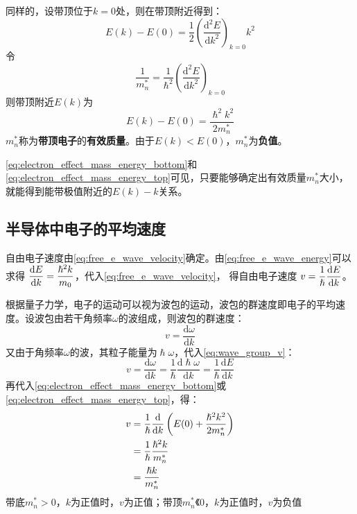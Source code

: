 同样的，设带顶位于$k=0$处，则在带顶附近得到：
\begin{equation}
    E(k)-E(0)=\frac{1}{2}\left(\frac{\mathrm{d^2}E}{\mathrm{d}k^2}\right)_{k=0}k^2
\end{equation}
令
\begin{equation*}
    \frac{1}{m_n^*}=\frac{1}{\hslash^2}\left(\frac{\mathrm{d}^2E}{\mathrm{d}k^2}\right)_{k=0}
\end{equation*}
则带顶附近$E(k)$为
\begin{equation}
    E(k)-E(0)=\frac{\hslash^2k^2}{2m_n^*}\label{eq:electron_effect_mass_energy_top}
\end{equation}
$m_n^*$称为\textbf{带顶电子}的\textbf{有效质量}。由于$E(k)<E(0)$，$m_n^*$为\textbf{负值}。

\autoref{eq:electron_effect_mass_energy_bottom}和\autoref{eq:electron_effect_mass_energy_top}可见，只要能够确定出有效质量$m_n^*$大小，就能得到能带极值附近的$E(k)-k$关系。

\subsection{半导体中电子的平均速度}

\vspace{1ex}自由电子速度由\autoref{eq:free_e_wave_velocity}确定。由\autoref{eq:free_e_wave_energy}可以求得 $\displaystyle\frac{\mathrm{d}E}{\mathrm{d}k}=\frac{\hslash^2k}{m_0}$，代入\autoref{eq:free_e_wave_velocity}，
\vspace{1ex}得自由电子速度 $\displaystyle v=\frac{1}{\hslash}\frac{\mathrm{d}E}{\mathrm{d}k}$。

根据量子力学，电子的运动可以视为波包的运动，波包的群速度即电子的平均速度。设波包由若干角频率$\omega$的波组成，则波包的群速度：
\begin{equation}
    v=\frac{\mathrm{d}\omega}{\mathrm{d}k}\label{eq:wave_group_v}
\end{equation}
又由于角频率$\omega$的波，其粒子能量为$\hslash\omega$，代入\autoref{eq:wave_group_v}：
\begin{equation}
    v=\frac{\mathrm{d}\omega}{\mathrm{d}k}=\frac{1}{\hslash}\frac{\mathrm{d}\hslash\omega}{\mathrm{d}k}=\frac{1}{\hslash}\frac{\mathrm{d}E}{\mathrm{d}k}\label{eq:semi_velocity_energy_relation}
\end{equation}
再代入\autoref{eq:electron_effect_mass_energy_bottom}或\autoref{eq:electron_effect_mass_energy_top}，得：
\begin{align}
    v&=\frac{1}{\hslash}\frac{\mathrm{d}}{\mathrm{d}k}\left(E(0)+\frac{\hslash^2k^2}{2m_n^*}\right)\notag\\
    &=\frac{1}{\hslash}\frac{\hslash^2k}{m_n^*}\notag\\
    &=\frac{\hslash k}{m_n^*}\label{eq:semi_velocity_k_m_eff_relation}
\end{align}
带底$m_n^*>0$，$k$为正值时，$v$为正值；带顶$m_n^*《0$，$k$为正值时，$v$为负值

